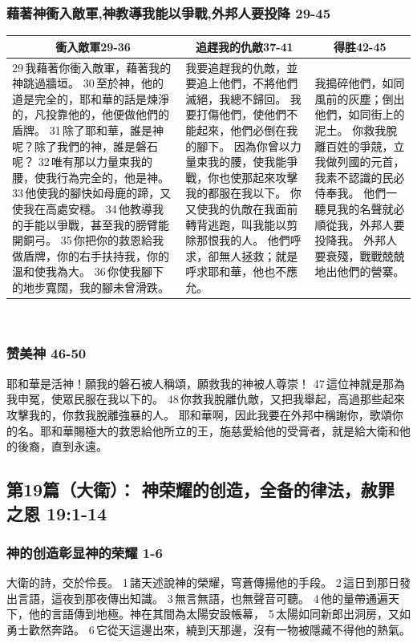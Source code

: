 \subsubsection{藉著神衝入敵軍,神教導我能以爭戰,外邦人要投降 29-45}
\begin{table}[H]
\centering
\begin{tabular}{p{7.25cm}|p{}|p{4.05cm}}\hline\hline
\multicolumn{1}{c|}{衝入敵軍29-36}&\multicolumn{1}{c|}{追趕我的仇敵37-41}&\multicolumn{1}{c}{得胜42-45}\\\hline
29 我藉著你衝入敵軍，藉著我的神跳過牆垣。
30 至於神，他的道是完全的，耶和華的話是煉淨的，凡投靠他的，他便做他們的盾牌。
31 除了耶和華，誰是神呢？除了我們的神，誰是磐石呢？
32 唯有那以力量束我的腰，使我行為完全的，他是神。
33 他使我的腳快如母鹿的蹄，又使我在高處安穩。
34 他教導我的手能以爭戰，甚至我的膀臂能開銅弓。
35 你把你的救恩給我做盾牌，你的右手扶持我，你的溫和使我為大。
36 你使我腳下的地步寬闊，我的腳未曾滑跌。
&我要追趕我的仇敵，並要追上他們，不將他們滅絕，我總不歸回。
我要打傷他們，使他們不能起來，他們必倒在我的腳下。
因為你曾以力量束我的腰，使我能爭戰，你也使那起來攻擊我的都服在我以下。
你又使我的仇敵在我面前轉背逃跑，叫我能以剪除那恨我的人。
他們呼求，卻無人拯救；就是呼求耶和華，他也不應允。
&我搗碎他們，如同風前的灰塵；倒出他們，如同街上的泥土。
你救我脫離百姓的爭競，立我做列國的元首，我素不認識的民必侍奉我。
他們一聽見我的名聲就必順從我，外邦人要投降我。
外邦人要衰殘，戰戰兢兢地出他們的營寨。\\\hline
\end{tabular}
\end{table} 

\subsubsection{赞美神  46-50}
耶和華是活神！願我的磐石被人稱頌，願救我的神被人尊崇！
47 這位神就是那為我申冤，使眾民服在我以下的。
48 你救我脫離仇敵，又把我舉起，高過那些起來攻擊我的，你救我脫離強暴的人。
耶和華啊，因此我要在外邦中稱謝你，歌頌你的名。耶和華賜極大的救恩給他所立的王，施慈愛給他的受膏者，就是給大衛和他的後裔，直到永遠。



\subsection{第19篇（大衛）： 神荣耀的创造，全备的律法，赦罪之恩 19:1-14}
\subsubsection{神的创造彰显神的荣耀 1-6}
大衛的詩，交於伶長。
1 諸天述說神的榮耀，穹蒼傳揚他的手段。
2 這日到那日發出言語，這夜到那夜傳出知識。
3 無言無語，也無聲音可聽。
4 他的量帶通遍天下，他的言語傳到地極。神在其間為太陽安設帳幕，
5 太陽如同新郎出洞房，又如勇士歡然奔路。
6 它從天這邊出來，繞到天那邊，沒有一物被隱藏不得他的熱氣。
